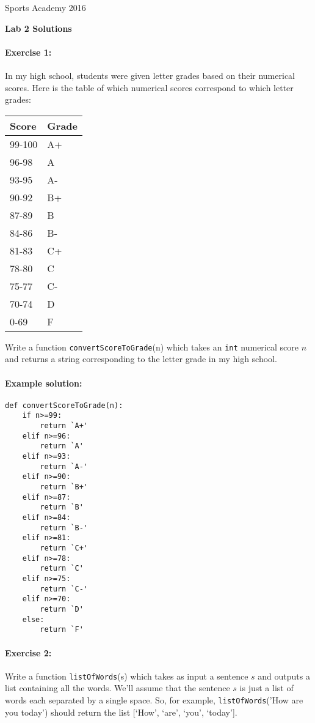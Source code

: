 \documentclass[11pt]{article}
\newlength{\toppush}
\newcommand{\htitle}[2]{\noindent\vspace*{-\toppush}\newline\parbox{6.5in}
 {\large Sports Academy \hfill #1\newline
\hspace*{\fill}{\bf Algorithms and Programming for High Schoolers} \hspace*{\fill} \newline
\mbox{}\hrulefill\mbox{}}\vspace*{1ex}\mbox{}\newline
\begin{center}{\Large\bf #2}\end{center}}
\begin{document}
\htitle{2016}{Lab 2 Solutions}

\paragraph{Exercise 1:}
In my high school, students were given letter grades based on their
numerical scores.  Here is the table of which numerical scores
correspond to which letter grades:

\begin{center}
\begin{tabular}{|l|l|}
\hline
Score & Grade\\
\hline
99-100 & A+\\
\hline
96-98 & A\\
\hline
93-95 & A-\\
\hline
90-92 & B+\\
\hline
87-89 & B\\
\hline
84-86 & B-\\
\hline
81-83 & C+\\
\hline
78-80 & C\\
\hline
75-77 & C-\\
\hline
70-74 & D\\
\hline
0-69 & F\\
\hline
\end{tabular}
\end{center}

Write a function \texttt{convertScoreToGrade}(n) which takes an
\texttt{int} numerical score $n$ and returns a string corresponding to
the letter grade in my high school.

\paragraph{Example solution:}
\begin{verbatim}
def convertScoreToGrade(n):
    if n>=99:
        return `A+'
    elif n>=96:
        return `A'
    elif n>=93:
        return `A-'
    elif n>=90:
        return `B+'
    elif n>=87:
        return `B'
    elif n>=84:
        return `B-'
    elif n>=81:
        return `C+'
    elif n>=78:
        return `C'
    elif n>=75:
        return `C-'
    elif n>=70:
        return `D'
    else:
        return `F'
\end{verbatim}

\paragraph{Exercise 2:}
Write a function \texttt{listOfWords}(s) which takes as input a
sentence $s$ and outputs a list containing all the words.  We'll
assume that the sentence $s$ is just a list of words each separated by
a single space.  So, for example, \texttt{listOfWords}('How are you today')
should return the list [`How', `are', `you', `today'].
\end{document}
